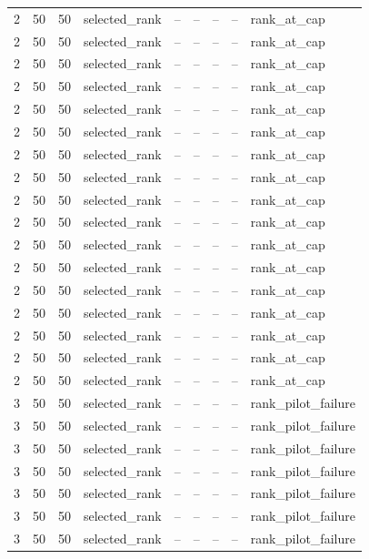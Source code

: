 \begin{longtable}{lllllllll}
2 & 50 & 50 & selected\_rank & -- & -- & -- & -- & rank\_at\_cap \\
2 & 50 & 50 & selected\_rank & -- & -- & -- & -- & rank\_at\_cap \\
2 & 50 & 50 & selected\_rank & -- & -- & -- & -- & rank\_at\_cap \\
2 & 50 & 50 & selected\_rank & -- & -- & -- & -- & rank\_at\_cap \\
2 & 50 & 50 & selected\_rank & -- & -- & -- & -- & rank\_at\_cap \\
2 & 50 & 50 & selected\_rank & -- & -- & -- & -- & rank\_at\_cap \\
2 & 50 & 50 & selected\_rank & -- & -- & -- & -- & rank\_at\_cap \\
2 & 50 & 50 & selected\_rank & -- & -- & -- & -- & rank\_at\_cap \\
2 & 50 & 50 & selected\_rank & -- & -- & -- & -- & rank\_at\_cap \\
2 & 50 & 50 & selected\_rank & -- & -- & -- & -- & rank\_at\_cap \\
2 & 50 & 50 & selected\_rank & -- & -- & -- & -- & rank\_at\_cap \\
2 & 50 & 50 & selected\_rank & -- & -- & -- & -- & rank\_at\_cap \\
2 & 50 & 50 & selected\_rank & -- & -- & -- & -- & rank\_at\_cap \\
2 & 50 & 50 & selected\_rank & -- & -- & -- & -- & rank\_at\_cap \\
2 & 50 & 50 & selected\_rank & -- & -- & -- & -- & rank\_at\_cap \\
2 & 50 & 50 & selected\_rank & -- & -- & -- & -- & rank\_at\_cap \\
2 & 50 & 50 & selected\_rank & -- & -- & -- & -- & rank\_at\_cap \\
3 & 50 & 50 & selected\_rank & -- & -- & -- & -- & rank\_pilot\_failure \\
3 & 50 & 50 & selected\_rank & -- & -- & -- & -- & rank\_pilot\_failure \\
3 & 50 & 50 & selected\_rank & -- & -- & -- & -- & rank\_pilot\_failure \\
3 & 50 & 50 & selected\_rank & -- & -- & -- & -- & rank\_pilot\_failure \\
3 & 50 & 50 & selected\_rank & -- & -- & -- & -- & rank\_pilot\_failure \\
3 & 50 & 50 & selected\_rank & -- & -- & -- & -- & rank\_pilot\_failure \\
3 & 50 & 50 & selected\_rank & -- & -- & -- & -- & rank\_pilot\_failure \\

\end{longtable}
